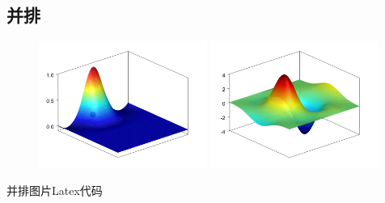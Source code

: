 \documentclass[engineeringmaster]{hquThesis}
\begin{document}
\subsection*{并排}
\begin{figure}[H]
    \centering
    \begin{subcaptiongroup}
    \includegraphics[width=0.49\textwidth]{figure/1.png}
    \label{1}
    \includegraphics[width=0.49\textwidth]{figure/2.png}
    \label{2}
    \end{subcaptiongroup}
\caption{}
\label{CHGraphsettings_fig2_meshfree}
\end{figure}
并排图片Latex代码
\end{document}

